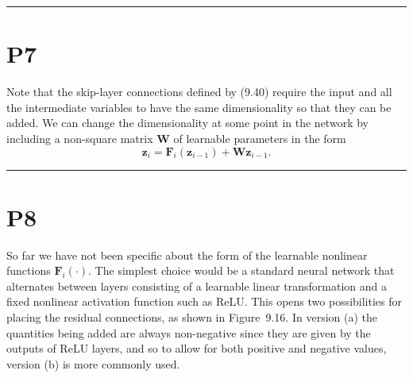 \documentclass{article}
\begin{document}
\noindent\rule{\linewidth}{0.4pt}

\section{P7}

Note that the skip-layer connections defined by (9.40) require the input and all the intermediate variables to have the same dimensionality so that they can be added. We can change the dimensionality at some point in the network by including a non-square matrix $\mathbf{W}$ of learnable parameters in the form
\begin{equation}
    \mathbf{z}_i = \mathbf{F}_i(\mathbf{z}_{i-1}) + \mathbf{W}\mathbf{z}_{i-1}.
    \label{eq:resnet-dim-change}
\end{equation}

\noindent\rule{\linewidth}{0.4pt}

\section{P8}

So far we have not been specific about the form of the learnable nonlinear functions $\mathbf{F}_i(\cdot)$. The simplest choice would be a standard neural network that alternates between layers consisting of a learnable linear transformation and a fixed nonlinear activation function such as ReLU. This opens two possibilities for placing the residual connections, as shown in Figure~9.16. In version (a) the quantities being added are always non-negative since they are given by the outputs of ReLU layers, and so to allow for both positive and negative values, version (b) is more commonly used.
\end{document}
